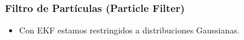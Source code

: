\begin{frame}
    \frametitle{Filtro de Partículas (Particle Filter)}
    
    
    \begin{itemize}
        \item Con EKF estamos restringidos a distribuciones Gaussianas.
    \end{itemize}
    
\end{frame}
